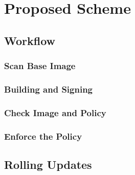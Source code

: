 \chapter{Proposed Scheme}

\section{Workflow}
\subsection{Scan Base Image}
\subsection{Building and Signing}
\subsection{Check Image and Policy}
\subsection{Enforce the Policy}

\section{Rolling Updates}